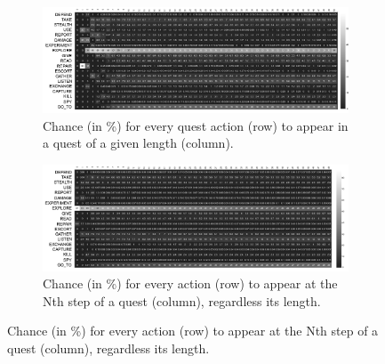 


\begin{figure}[t]
    \centering
    \begin{subfigure}[t]{0.9\textwidth}
        \centering
        \includegraphics[width=1\textwidth]{included-papers-tex/paper-8/figures/perLengthExperiment-an.png}
        \caption{Chance (in \%) for every quest action (row) to appear in a quest of a given length (column).}
        \label{figs:evaluation:length}
    \end{subfigure} \hfill%
    \begin{subfigure}[t]{0.9\textwidth}
        \centering
         \includegraphics[width=1\textwidth]{included-papers-tex/paper-8/figures/perStepsExperiment-an.png}
        \caption{Chance (in \%) for every action (row) to appear at the Nth step of a quest (column), regardless its length.}
        \label{figs:evaluation:steps}

\end{subfigure}
\end{figure}

